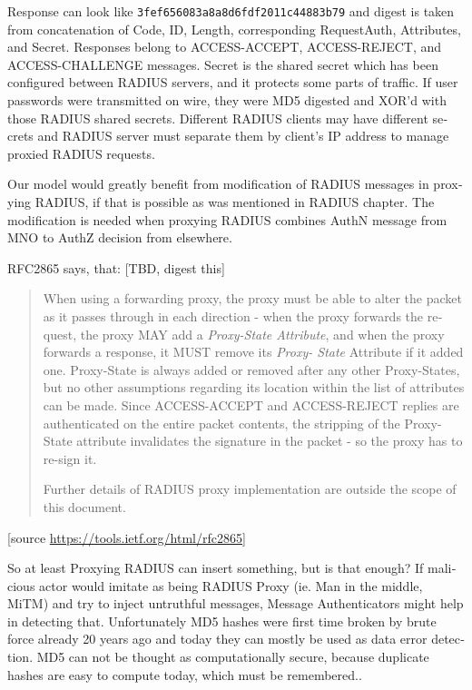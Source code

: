 \documentclass[12pt,a4paper,english]{tutthesis}
\begin{document}
\begin{otherlanguage}{english}
Response can look like \texttt{3fef656083a8a8d6fdf2011c44883b79} and digest
is taken from concatenation of Code, ID, Length, corresponding
Request\-Auth, Attributes, and Secret. Responses belong to
ACCESS-ACCEPT, ACCESS-REJECT, and ACCESS-CHALLENGE messages.  Secret
is the shared secret which has been configured between RADIUS servers,
and it protects some parts of traffic. If user passwords were
transmitted on wire, they were MD5 digested and XOR'd with those
RADIUS shared secrets.  Different RADIUS clients may have different
secrets and RADIUS server must separate them by client's IP address to
manage proxied RADIUS requests.\cite{radiusbook}


Our model would greatly benefit from modification of RADIUS messages in proxying
RADIUS, if that is possible as was mentioned in RADIUS chapter.
The modification is needed when proxying RADIUS combines AuthN message
from MNO to AuthZ decision from elsewhere.


RFC2865 says, that: [TBD, digest this]
\begin{quote}
When using a forwarding proxy, the proxy must be able to alter the
      packet as it passes through in each direction - when the proxy
      forwards the request, the proxy MAY add a \emph{Proxy-State
      Attribute}, and when the proxy forwards a response, it MUST
      remove its \emph{Proxy- State} Attribute if it added one.
      Proxy-State is always added or removed after any other
      Proxy-States, but no other assumptions regarding its location
      within the list of attributes can be made.  Since ACCESS-ACCEPT
      and ACCESS-REJECT replies are authenticated on the entire packet
      contents, the stripping of the Proxy-State attribute invalidates
      the signature in the packet - so the proxy has to re-sign it.

Further details of RADIUS proxy implementation are outside the
scope of this document.
\end{quote}
[source \url{https://tools.ietf.org/html/rfc2865}]

So at least Proxying RADIUS can insert something, but is that enough?
If malicious actor would imitate as being RADIUS Proxy (ie. Man in the
middle, MiTM) and try
to inject untruthful messages, Message Authenticators might help in detecting
that. Unfortunately MD5 hashes were first time broken by brute force
already 20 years ago and today they can mostly be used as data error
detection\cite[p.2]{rfc6151}. MD5 can not be thought as computationally secure,
because duplicate hashes are easy to compute today, which must be
remembered.\cite{xie2013fast}. 





\end{otherlanguage}
\end{document}

